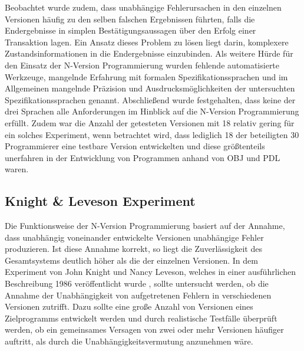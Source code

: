 {Beobachtet wurde zudem, dass unabhängige Fehlerursachen in den einzelnen Versionen häufig zu den selben falschen Ergebnissen führten, falls die Endergebnisse in simplen Bestätigungsaussagen über den Erfolg einer Transaktion lagen. Ein Ansatz dieses Problem zu lösen liegt darin, komplexere Zustandsinformationen in die Endergebnisse einzubinden.
Als weitere Hürde für den Einsatz der N-Version Programmierung wurden fehlende automatisierte Werkzeuge, mangelnde Erfahrung mit formalen Spezifikationssprachen und im Allgemeinen mangelnde Präzision und Ausdrucksmöglichkeiten der untersuchten Spezifikationssprachen genannt.
Abschließend wurde festgehalten, dass keine der drei Sprachen alle Anforderungen im Hinblick auf die N-Version Programmierung erfüllt.
Zudem war die Anzahl der getesteten Versionen mit 18 relativ gering für ein solches Experiment, wenn betrachtet wird, dass lediglich 18 der beteiligten 30 Programmierer eine testbare Version entwickelten und diese größtenteils unerfahren in der Entwicklung von Programmen anhand von OBJ und PDL waren.
%
\subsection{Knight \& Leveson Experiment}\label{matrixexperiement}
%
Die Funktionsweise der N-Version Programmierung basiert auf der Annahme, dass unabhängig voneinander entwickelte Versionen unabhängige Fehler produzieren.
Ist diese Annahme korrekt, so liegt die Zuverlässigkeit des Gesamtsystems deutlich höher als die der einzelnen Versionen.
In dem Experiment von John Knight und Nancy Leveson, welches in einer ausführlichen Beschreibung 1986 veröffentlicht wurde \cite{Knight:1986:EEA:10677.10688}, sollte untersucht werden, ob die Annahme der Unabhängigkeit von aufgetretenen Fehlern in verschiedenen Versionen zutrifft. 
Dazu sollte eine große Anzahl von Versionen eines Zielprogramms entwickelt werden und durch realistische Testfälle überprüft werden, ob ein gemeinsames Versagen von zwei oder mehr Versionen häufiger auftritt, als durch die Unabhängigkeitsvermutung anzunehmen wäre.
%
%
}
